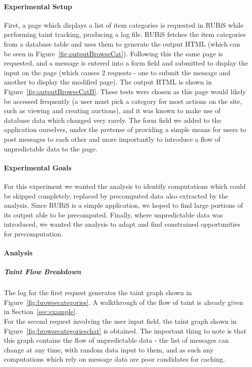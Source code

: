 \documentclass[msc,oneside]{ubcthesis}
\begin{document}
\paragraph{Experimental Setup}
\label{sec:rubisprecompsetup}
First, a page which displays a list of item categories is requested in RUBiS while performing taint tracking, producing a log file. RUBiS fetches the item categories from a database table and uses them to generate the output HTML (which can be seen in Figure~\ref{fig:outputBrowseCat}). Following this the same page is requested, and a message is entered into a form field and submitted to display the input on the page (which causes 2 requests - one to submit the message and another to display the modified page). The output HTML is shown in Figure~\ref{fig:outputBrowseCatB}. These tests were chosen as this page would likely be accessed frequently (a user must pick a category for most actions on the site, such as viewing and creating auctions), and it was known to make use of database data which changed very rarely. The form field we added to the application ourselves, under the pretense of providing a simple means for users to post messages to each other and more importantly to introduce a flow of unpredictable data to the page.

\paragraph{Experimental Goals}
For this experiment we wanted the analysis to identify computations which could be skipped completely, replaced by precomputed data also extracted by the analysis. Since RUBiS is a simple application, we hoped to find large portions of its output able to be precomputed. Finally, where unpredictable data was introduced, we wanted the analysis to adapt and find constrained opportunities for precomputation.

\paragraph{Analysis}
\subparagraph{Taint Flow Breakdown}
\label{sec:rubisprecompflow}
The log for the first request generates the taint graph shown in Figure~\ref{fig:browsecategories}. A walkthrough of the flow of taint is already given in Section~\ref{sec:example}.\\

For the second request involving the user input field, the taint graph shown in Figure~\ref{fig:browsecategorieschat} is obtained. The important thing to note is that this graph contains the flow of unpredictable data - the list of messages can change at any time, with random data input to them, and as such any computations which rely on message data are poor candidates for caching.\\
\end{document}
